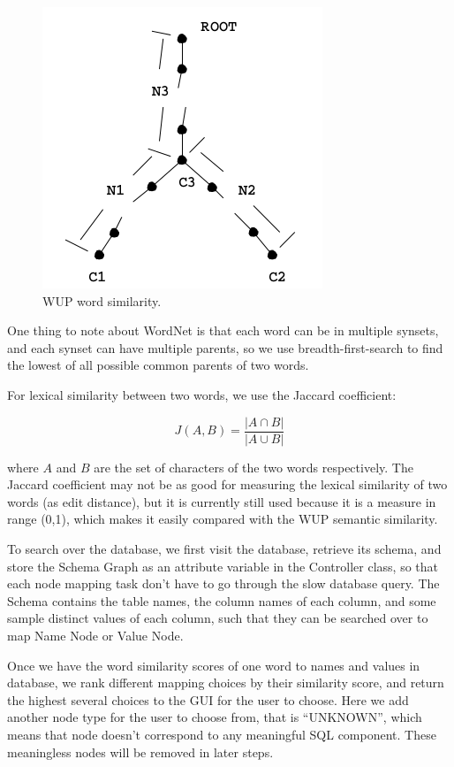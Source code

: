 \documentclass[twocolumn]{article}
\begin{document}
\begin{figure}[ht]
  \centering
  \includegraphics[width=0.7\linewidth]{figures/wordnet_tree.png}
  \caption[caption for wordnet tree]{WUP word similarity.\protect\footnotemark }
\end{figure}

One thing to note about WordNet is that each word can be in multiple synsets, and each synset can have multiple parents, so we use breadth-first-search to find the lowest of all possible common parents of two words.


For lexical similarity between two words, we use the Jaccard coefficient:

$$ J(A, B) = \frac{|A \cap B|}{|A \cup B|}$$

where $A$ and $B$ are the set of characters of the two words respectively. The Jaccard coefficient may not be as good for measuring the lexical similarity of two words (as edit distance), but it is currently still used because it is a measure in range (0,1), which makes it easily compared with the WUP semantic similarity.

To search over the database, we first visit the database, retrieve its schema, and store the Schema Graph as an attribute variable in the Controller class, so that each node mapping task don’t have to go through the slow database query. The Schema contains the table names, the column names of each column, and some sample distinct values of each column, such that they can be searched over to map Name Node or Value Node.

Once we have the word similarity scores of one word to names and values in database, we rank different mapping choices by their similarity score, and return the highest several choices to the GUI for the user to choose. Here we add another node type for the user to choose from, that is “UNKNOWN”, which means that node doesn’t correspond to any meaningful SQL component. These meaningless nodes will be removed in later steps.
\end{document}
